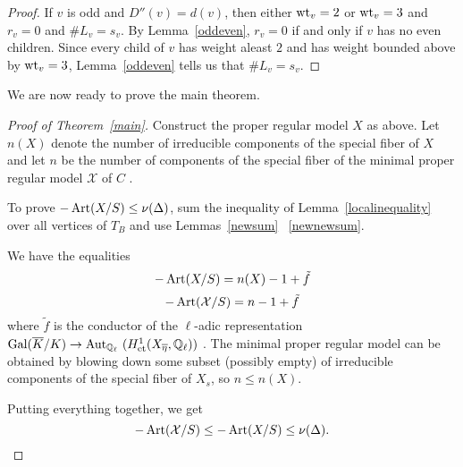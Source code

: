 \begin{proof}
If $v$ is odd and $D''(v) = d(v)$, then either $\operatorname{wt}_v = 2$ or $\operatorname{wt}_v = 3$ and $r_v = 0$ and $\# L_v = s_v$. By Lemma~\ref{oddeven}, $r_v = 0$ if and only if $v$ has no even children. Since every child of $v$ has weight aleast $2$ and has weight bounded above by $\operatorname{wt}_v = 3$, Lemma~\ref{oddeven} tells us that $\#L_v = s_v$.
\end{proof}


We are now ready to prove the main theorem.
\begin{proof}[Proof of Theorem~\ref{main}]
Construct the proper regular model $X$ as above. Let $n(X)$ denote the number of irreducible components of the special fiber of $X$ and let $n$ be the number of components of the special fiber of the minimal proper regular model $\mathcal{X}$ of $C$ . 

To prove $-\operatorname{Art}(X/S) \leq \nu(\Delta)$, sum the inequality of Lemma~\ref{localinequality} over all vertices of $T_B$ and use Lemmas~\ref{newsum} ~\ref{newnewsum}.

We have the equalities 
\[ -\operatorname{Art}(X/S) = n(X)-1+\tilde{f} \]
\[ -\operatorname{Art}(\mathcal{X}/S) = n-1+\tilde{f} \]
where $\tilde{f}$ is the conductor of the $\ell$-adic representation $\operatorname{Gal} (\overline{K}/K) \rightarrow \operatorname{Aut}_{\mathbb Q_\ell} \ (H^1_{\mathrm{et}}(X_{\overline{\eta}}, \mathbb Q_\ell))$ \cite[Proposition~1]{liup}. The minimal proper regular model can be obtained by blowing down some subset (possibly empty) of irreducible components of the special fiber of $X_s$, so $n \leq n(X)$. 

Putting everything together, we get
\[ -\operatorname{Art}(\mathcal{X}/S) \leq -\operatorname{Art}(X/S) \leq \nu(\Delta) .\]
 
\end{proof}

